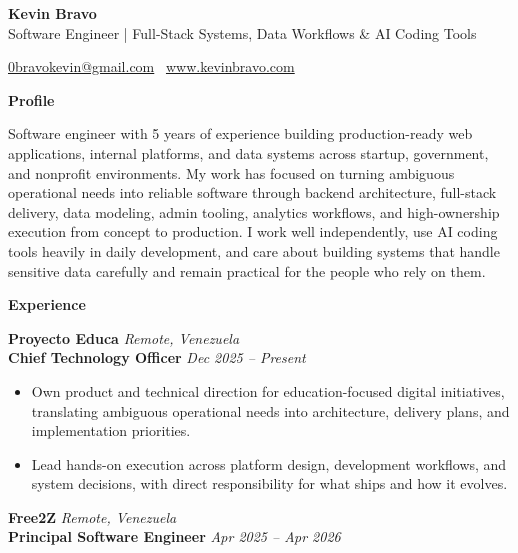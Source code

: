 \documentclass[11pt]{article}
\begin{document}
\begin{center}
    {\LARGE \textbf{Kevin Bravo}}\\
    Software Engineer | Full-Stack Systems, Data Workflows \& AI Coding Tools \\
    \hrulefill
\end{center}
\begin{center}
    \href{mailto:0bravokevin@gmail.com}{0bravokevin@gmail.com}
    \textbullet\ 
    \href{http://www.kevinbravo.com}{www.kevinbravo.com}
\end{center}
\vspace{4pt}
\begin{center}
    \textbf{Profile}
\end{center}
\vspace{-4pt}
Software engineer with 5 years of experience building production-ready web applications, internal platforms, and data systems across startup, government, and nonprofit environments. My work has focused on turning ambiguous operational needs into reliable software through backend architecture, full-stack delivery, data modeling, admin tooling, analytics workflows, and high-ownership execution from concept to production. I work well independently, use AI coding tools heavily in daily development, and care about building systems that handle sensitive data carefully and remain practical for the people who rely on them.
\vspace{8pt}
\begin{center}
    \textbf{Experience}
\end{center}
\vspace{-4pt}
\textbf{Proyecto Educa} \hfill \textit{Remote, Venezuela} \\
\textbf{Chief Technology Officer} \hfill \textit{Dec 2025 -- Present}
\begin{itemize}
    \item Own product and technical direction for education-focused digital initiatives, translating ambiguous operational needs into architecture, delivery plans, and implementation priorities.
    \item Lead hands-on execution across platform design, development workflows, and system decisions, with direct responsibility for what ships and how it evolves.
\end{itemize}
\vspace{10pt}
\textbf{Free2Z} \hfill \textit{Remote, Venezuela} \\
\textbf{Principal Software Engineer} \hfill \textit{Apr 2025 -- Apr 2026}
\end{document}
